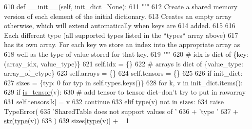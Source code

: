 \begin{DoxyCode}
610     \textcolor{keyword}{def }\_\_init\_\_(self, init\_dict=None):
611         \textcolor{stringliteral}{"""}
612 \textcolor{stringliteral}{        Create a shared memory version of each element of the initial dictionary.}
613 \textcolor{stringliteral}{        Creates an empty array otherwise, which will extend automatically when keys are}
614 \textcolor{stringliteral}{        added.}
615 \textcolor{stringliteral}{}
616 \textcolor{stringliteral}{        Each different type (all supported types listed in the ``types`` array above)}
617 \textcolor{stringliteral}{        has its own array. For each key we store an index into the appropriate array as}
618 \textcolor{stringliteral}{        well as the type of value stored for that key.}
619 \textcolor{stringliteral}{        """}
620         \textcolor{comment}{# idx is dict of \{key: (array\_idx, value\_type)\}}
621         self.idx = \{\}
622         \textcolor{comment}{# arrays is dict of \{value\_type: array\_of\_ctype\}}
623         self.arrays = \{\}
624         self.tensors = \{\}
625 
626         \textcolor{keywordflow}{if} init\_dict:
627             sizes = \{typ: 0 \textcolor{keywordflow}{for} typ \textcolor{keywordflow}{in} self.types.keys()\}
628             \textcolor{keywordflow}{for} k, v \textcolor{keywordflow}{in} init\_dict.items():
629                 \textcolor{keywordflow}{if} \hyperlink{namespaceparlai_1_1agents_1_1legacy__agents_1_1seq2seq_1_1utils__v0_a96c8bd68b645f94b1257c37f8c5646f5}{is\_tensor}(v):
630                     \textcolor{comment}{# add tensor to tensor dict--don't try to put in rawarray}
631                     self.tensors[k] = v
632                     \textcolor{keywordflow}{continue}
633                 \textcolor{keywordflow}{elif} \hyperlink{namespaceparlai_1_1agents_1_1tfidf__retriever_1_1build__tfidf_ad5dfae268e23f506da084a9efb72f619}{type}(v) \textcolor{keywordflow}{not} \textcolor{keywordflow}{in} sizes:
634                     \textcolor{keywordflow}{raise} TypeError(
635                         \textcolor{stringliteral}{'SharedTable does not support values of '}
636                         + \textcolor{stringliteral}{'type '}
637                         + \hyperlink{namespacegenerate__task__READMEs_a5b88452ffb87b78c8c85ececebafc09f}{str}(\hyperlink{namespaceparlai_1_1agents_1_1tfidf__retriever_1_1build__tfidf_ad5dfae268e23f506da084a9efb72f619}{type}(v))
638                     )
639                 sizes[\hyperlink{namespaceparlai_1_1agents_1_1tfidf__retriever_1_1build__tfidf_ad5dfae268e23f506da084a9efb72f619}{type}(v)] += 1

\end{DoxyCode}
